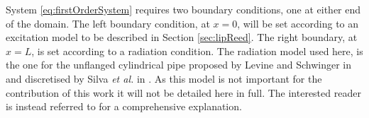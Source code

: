 System \eqref{eq:firstOrderSystem} requires two boundary conditions, one at either end of the domain. The left boundary condition, at $x=0$, will be set according to an excitation model to be described in Section \ref{sec:lipReed}. The right boundary, at $x=L$, is set according to a radiation condition. %
The radiation model used here, is the one for the unflanged cylindrical pipe proposed by Levine and Schwinger in \cite{Levine1948} and discretised by Silva \emph{et al.} in \cite{Silva2009}. As this model is not important for the contribution of this work it will not be detailed here in full. The interested reader is instead referred to \cite{Bilbao2013, Harrison2018} for a comprehensive explanation. %



